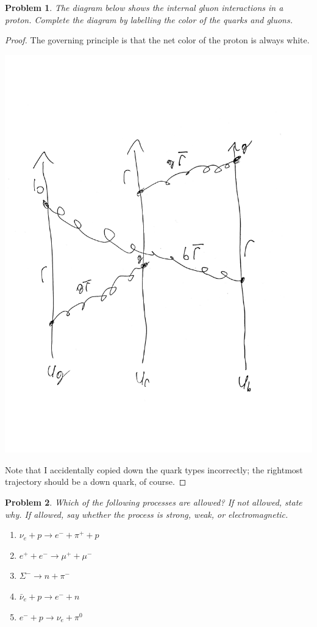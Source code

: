 \documentclass{article}
\newtheorem{plm}{Problem}
\begin{document}
\begin{plm}
  The diagram below shows the internal gluon interactions in a proton.
  Complete the diagram by labelling the color of the quarks and gluons.
\end{plm}

\begin{proof}
  The governing principle is that the net color of the proton is always white.
  \begin{center}
    \includegraphics[scale=0.3]{gluon_exchange.pdf}
  \end{center}
  Note that I accidentally copied down the quark types incorrectly; the rightmost trajectory should be a down quark, of course.
\end{proof}

\begin{plm}
  Which of the following processes are allowed?
  If not allowed, state why.
  If allowed, say whether the process is strong, weak, or electromagnetic.
  \begin{enumerate}
  \item $\nu_{e} + p \to e^{-} + \pi^{+} + p$
  \item $e^{+} + e^{-} \to \mu^{+} + \mu^{-}$
  \item $\Sigma^{-} \to n + \pi^{-}$
  \item $\bar{\nu}_{e} + p \to e^{-} + n$
  \item $e^{-} + p \to \nu_{e} + \pi^{0}$
  \end{enumerate}
\end{plm}
\end{document}

